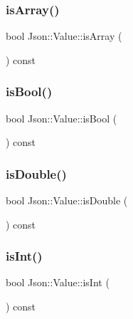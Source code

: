 \subsubsection{\texorpdfstring{is\+Array()}{isArray()}}
{\footnotesize\ttfamily bool Json\+::\+Value\+::is\+Array (\begin{DoxyParamCaption}{ }\end{DoxyParamCaption}) const}

\mbox{\label{class_json_1_1_value_ab1f02651cb89d0f18b63a036959391ba}} 
\subsubsection{\texorpdfstring{is\+Bool()}{isBool()}}
{\footnotesize\ttfamily bool Json\+::\+Value\+::is\+Bool (\begin{DoxyParamCaption}{ }\end{DoxyParamCaption}) const}

\mbox{\label{class_json_1_1_value_a4a2e2a790e19a1c09fc5dd12d7ad47b5}} 
\subsubsection{\texorpdfstring{is\+Double()}{isDouble()}}
{\footnotesize\ttfamily bool Json\+::\+Value\+::is\+Double (\begin{DoxyParamCaption}{ }\end{DoxyParamCaption}) const}

\mbox{\label{class_json_1_1_value_aff51d8b52979ca06cf9d909accd5f695}} 
\subsubsection{\texorpdfstring{is\+Int()}{isInt()}}
{\footnotesize\ttfamily bool Json\+::\+Value\+::is\+Int (\begin{DoxyParamCaption}{ }\end{DoxyParamCaption}) const}



